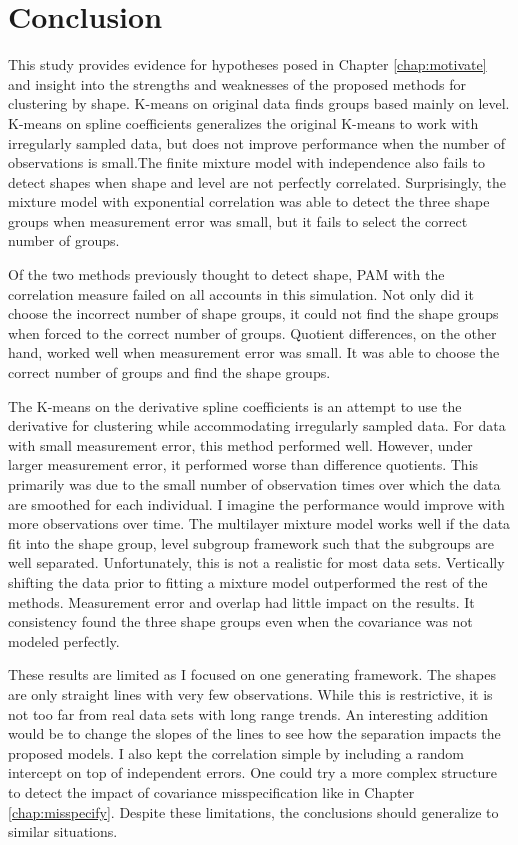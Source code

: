 \section{Conclusion}
This study provides evidence for hypotheses posed in Chapter \ref{chap:motivate} and insight into the strengths and weaknesses of the proposed methods for clustering by shape. K-means on original data finds groups based mainly on level. K-means on spline coefficients generalizes the original K-means to work with irregularly sampled data, but does not improve performance when the number of observations is small.The finite mixture model with independence also fails to detect shapes when shape and level are not perfectly correlated. Surprisingly, the mixture model with exponential correlation was able to detect the three shape groups when measurement error was small, but it fails to select the correct number of groups.

Of the two methods previously thought to detect shape, PAM with the correlation measure failed on all accounts in this simulation. Not only did it choose the incorrect number of shape groups, it could not find the shape groups when forced to the correct number of groups. Quotient differences, on the other hand, worked well when measurement error was small. It was able to choose the correct number of groups and find the shape groups.

The K-means on the derivative spline coefficients is an attempt to use the derivative for clustering while accommodating irregularly sampled data. For data with small measurement error, this method performed well. However, under larger measurement error, it performed worse than difference quotients. This primarily was due to the small number of observation times over which the data are smoothed for each individual. I imagine the performance would improve with more observations over time.  The multilayer mixture model works well if the data fit into the shape group, level subgroup framework such that the subgroups are well separated. Unfortunately, this is not a realistic for most data sets. Vertically shifting the data prior to fitting a mixture model outperformed the rest of the methods. Measurement error and overlap had little impact on the results. It consistency found the three shape groups even when the covariance was not modeled perfectly.

These results are limited as I focused on one generating framework. The shapes are only straight lines with very few observations. While this is restrictive, it is not too far from real data sets with long range trends. An interesting addition would be to change the slopes of the lines to see how the separation impacts the proposed models. I also kept the correlation simple by including a random intercept on top of independent errors. One could try a more complex structure to detect the impact of covariance misspecification like in Chapter \ref{chap:misspecify}. Despite these limitations, the conclusions should generalize to similar situations. 


